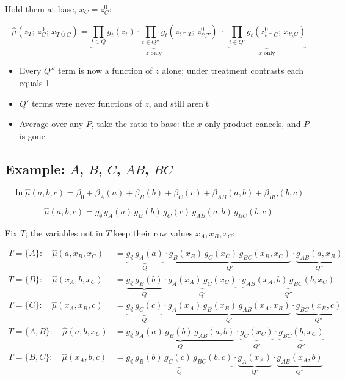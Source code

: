 \documentclass[
  letterpaper,
  DIV=11,
  numbers=noendperiod]{scrartcl}
\providecommand{\tightlist}{%
  \setlength{\itemsep}{0pt}\setlength{\parskip}{0pt}}
\begin{document}
Hold them at base, \(x_C = z^0_C\):

\[
\hat{\mu}(z_T;\, z^0_C;\, x_{\overline{T \cup C}})
= \underbrace{\prod_{t \in Q} g_t(z_t) \cdot \prod_{t \in Q''} g_t(z_{t \cap T};\, z^0_{t \setminus T})}_{z \text{ only}}
\;\cdot\;
\underbrace{\prod_{t \in Q'} g_t(z^0_{t \cap C};\, x_{t \setminus C})}_{x \text{ only}}
\]

\begin{itemize}
\tightlist
\item
  Every \(Q''\) term is now a function of \(z\) alone; under treatment
  contrasts each equals 1
\item
  \(Q'\) terms were never functions of \(z\), and still aren't
\item
  Average over any \(P\), take the ratio to base: the \(x\)-only product
  cancels, and \(P\) is gone
\end{itemize}

\subsection{\texorpdfstring{Example: \(A\), \(B\), \(C\), \(AB\),
\(BC\)}{Example: A, B, C, AB, BC}}\label{example-a-b-c-ab-bc}

\[
\ln \hat{\mu}(a, b, c) = \beta_0 + \beta_A(a) + \beta_B(b) + \beta_C(c) + \beta_{AB}(a, b) + \beta_{BC}(b, c)
\]

\[
\hat{\mu}(a, b, c) = g_\emptyset\, g_A(a)\, g_B(b)\, g_C(c)\, g_{AB}(a, b)\, g_{BC}(b, c)
\]

Fix \(T\); the variables not in \(T\) keep their row values
\(x_A, x_B, x_C\):

\[
\begin{aligned}
T = \{A\}:\quad \hat{\mu}(a, x_B, x_C) &= \underbrace{g_\emptyset\, g_A(a)}_{Q} \cdot \underbrace{g_B(x_B)\, g_C(x_C)\, g_{BC}(x_B, x_C)}_{Q'} \cdot \underbrace{g_{AB}(a, x_B)}_{Q''}\\[4pt]
T = \{B\}:\quad \hat{\mu}(x_A, b, x_C) &= \underbrace{g_\emptyset\, g_B(b)}_{Q} \cdot \underbrace{g_A(x_A)\, g_C(x_C)}_{Q'} \cdot \underbrace{g_{AB}(x_A, b)\, g_{BC}(b, x_C)}_{Q''}\\[4pt]
T = \{C\}:\quad \hat{\mu}(x_A, x_B, c) &= \underbrace{g_\emptyset\, g_C(c)}_{Q} \cdot \underbrace{g_A(x_A)\, g_B(x_B)\, g_{AB}(x_A, x_B)}_{Q'} \cdot \underbrace{g_{BC}(x_B, c)}_{Q''}\\[4pt]
T = \{A, B\}:\quad \hat{\mu}(a, b, x_C) &= \underbrace{g_\emptyset\, g_A(a)\, g_B(b)\, g_{AB}(a, b)}_{Q} \cdot \underbrace{g_C(x_C)}_{Q'} \cdot \underbrace{g_{BC}(b, x_C)}_{Q''}\\[4pt]
T = \{B, C\}:\quad \hat{\mu}(x_A, b, c) &= \underbrace{g_\emptyset\, g_B(b)\, g_C(c)\, g_{BC}(b, c)}_{Q} \cdot \underbrace{g_A(x_A)}_{Q'} \cdot \underbrace{g_{AB}(x_A, b)}_{Q''}
\end{aligned}
\]
\end{document}

